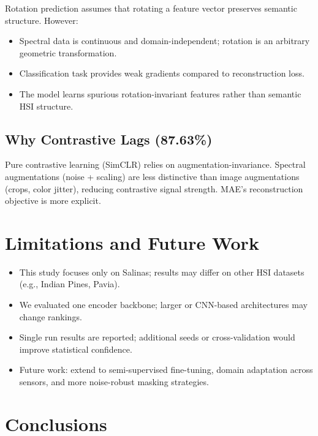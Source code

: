 \documentclass[11pt,a4paper]{article}
\begin{document}
Rotation prediction assumes that rotating a feature vector preserves semantic structure. However:
\begin{itemize}
    \item Spectral data is continuous and domain-independent; rotation is an arbitrary geometric transformation.
    \item Classification task provides weak gradients compared to reconstruction loss.
    \item The model learns spurious rotation-invariant features rather than semantic HSI structure.
\end{itemize}

\subsection{Why Contrastive Lags (87.63\%)}

Pure contrastive learning (SimCLR) relies on augmentation-invariance. Spectral augmentations (noise + scaling) are less distinctive than image augmentations (crops, color jitter), reducing contrastive signal strength. MAE's reconstruction objective is more explicit.

\section{Limitations and Future Work}

\begin{itemize}
    \item This study focuses only on Salinas; results may differ on other HSI datasets (e.g., Indian Pines, Pavia).
    \item We evaluated one encoder backbone; larger or CNN-based architectures may change rankings.
    \item Single run results are reported; additional seeds or cross-validation would improve statistical confidence.
    \item Future work: extend to semi-supervised fine-tuning, domain adaptation across sensors, and more noise-robust masking strategies.
\end{itemize}

\section{Conclusions}
\end{document}
